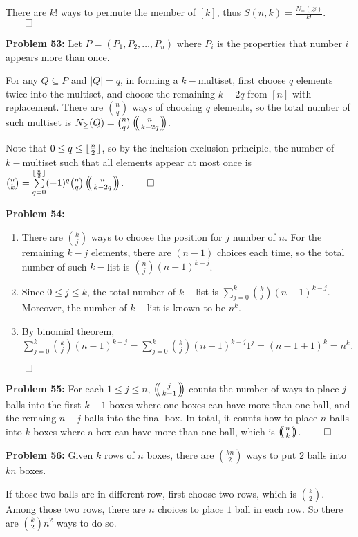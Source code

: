 \documentclass[12pt]{article}
\DeclarePairedDelimiter{\floor}{\lfloor}{\rfloor}
\def\multiset#1#2{\ensuremath{\left(\kern-.3em\left(\genfrac{}{}{0pt}{}{#1}{#2}\right)\kern-.3em\right)}}
\newcommand{\prob}[1]{\textbf{Problem #1:}}
\begin{document}
There are $k!$ ways to permute the member of $[k]$, thus $S(n, k) = \frac{N_{=}(\varnothing)}{k!}$. $\qed$

\prob{53} Let $P = (P_1, P_2, \dots, P_n)$ where $P_i$ is the properties that number $i$ appears more than once. 

For any $Q \subseteq P$ and $|Q| = q$, in forming a $k-$multiset, first choose $q$ elements twice into the multiset, and choose the remaining $k-2q$ from $[n]$ with replacement. There are $\binom{n}{q}$ ways of choosing $q$ elements, so the total number of such multiset is $N_{\geq} (Q) = \binom{n}{q} \multiset{n}{k-2q}$.

Note that $0 \le q \le \floor{\frac{n}{2}}$, so by the inclusion-exclusion principle, the number of $k-$multiset such that all elements appear at most once is $\binom{n}{k} = \sum\limits_{q=0}^{\floor{\frac{n}{2}}} (-1)^q \binom{n}{q} \multiset{n}{k-2q}$. $\qed$

\prob{54} 
\begin{enumerate}[label=(\alph*)]
    \item There are $\binom{k}{j}$ ways to choose the position for $j$ number of $n$. For the remaining $k-j$ elements, there are $(n-1)$ choices each time, so the total number of such $k-$list is $\binom{n}{j} (n-1)^{k-j}$.
    \item Since $0 \le j \le k$, the total number of $k-$list is $\sum\limits_{j=0}^{k} \binom{k}{j} (n-1)^{k-j}$. Moreover, the number of $k-$list is known to be $n^k$. 
    \item By binomial theorem, $\sum\limits_{j=0}^{k} \binom{k}{j} (n-1)^{k-j} = \sum\limits_{j=0}^{k} \binom{k}{j} (n-1)^{k-j} 1^j = (n-1+1)^k = n^k$. 
\end{enumerate} $\qed$

\prob{55} For each $1 \le j \le n$, $\multiset{j}{k-1}$ counts the number of ways to place $j$ balls into the first $k-1$ boxes where one boxes can have more than one ball, and the remaing $n-j$ balls into the final box. In total, it counts how to place $n$ balls into $k$ boxes where a box can have more than one ball, which is $\multiset{n}{k}$. $\qed$

\prob{56} Given $k$ rows of $n$ boxes, there are $\binom{kn}{2}$ ways to put $2$ balls into $kn$ boxes. 

        If those two balls are in different row, first choose two rows, which is $\binom{k}{2}$. Among those two rows, there are $n$ choices to place $1$ ball in each row. So there are $\binom{k}{2} n^2$ ways to do so. 
\end{document}
